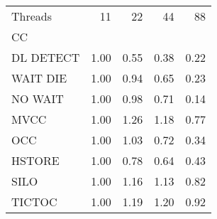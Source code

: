 \begin{tabular}{lrrrr}
\toprule
Threads &   11 &   22 &   44 &   88 \\
CC        &      &      &      &      \\
\midrule
DL DETECT & 1.00 & 0.55 & 0.38 & 0.22 \\
WAIT DIE  & 1.00 & 0.94 & 0.65 & 0.23 \\
NO WAIT   & 1.00 & 0.98 & 0.71 & 0.14 \\
MVCC      & 1.00 & 1.26 & 1.18 & 0.77 \\
OCC       & 1.00 & 1.03 & 0.72 & 0.34 \\
HSTORE    & 1.00 & 0.78 & 0.64 & 0.43 \\
SILO      & 1.00 & 1.16 & 1.13 & 0.82 \\
TICTOC    & 1.00 & 1.19 & 1.20 & 0.92 \\
\bottomrule
\end{tabular}
